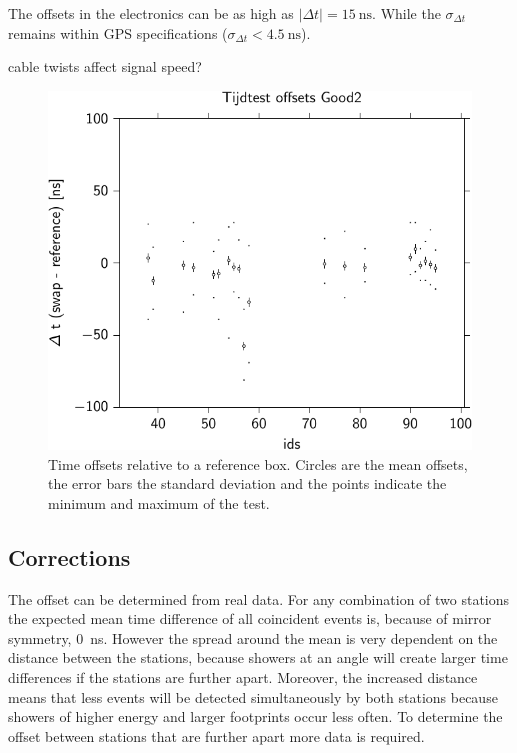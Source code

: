 The offsets in the \hisparc electronics can be as high as $|\Delta t| =
\SI{15}{\nano\second}$. While the $\sigma_{\Delta t}$ remains within GPS
specifications ($\sigma_{\Delta t} < \SI{4.5}{\nano\second}$).


\gps cable twists affect signal speed?

\begin{figure}
    \centering
    \includegraphics{plots/calibration/hisparc_offsets}
    \caption{Time offsets relative to a reference box. Circles are the
             mean offsets, the error bars the standard deviation and the
             points indicate the minimum and maximum of the test.}
    \label{fig:hisparc_offsets}
\end{figure}


\subsection{Corrections}

The offset can be determined from real data. For any combination of two
stations the expected mean time difference of all coincident events is,
because of mirror symmetry, \SI{0}{\nano\second}. However the spread
around the mean is very dependent on the distance between the stations,
because showers at an angle will create larger time differences if the
stations are further apart. Moreover, the increased distance means that
less events will be detected simultaneously by both stations because
showers of higher energy and larger footprints occur less often. To
determine the offset between stations that are further apart more data
is required.
